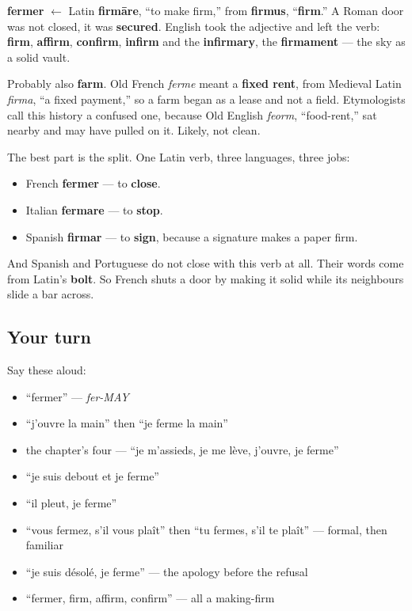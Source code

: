 \begin{cousinweb}
\textbf{fermer} $\leftarrow$ Latin \textbf{firmāre}, \textquotedblleft{}to make firm,\textquotedblright{} from \textbf{firmus}, \textquotedblleft{}\textbf{firm}.\textquotedblright{} A Roman door was not closed, it was \textbf{secured}. English took the adjective and left the verb: \textbf{firm}, \textbf{affirm}, \textbf{confirm}, \textbf{infirm} and the \textbf{infirmary}, the \textbf{firmament} — the sky as a solid vault.

Probably also \textbf{farm}. Old French \emph{ferme} meant a \textbf{fixed rent}, from Medieval Latin \emph{firma}, \textquotedblleft{}a fixed payment,\textquotedblright{} so a farm began as a lease and not a field. Etymologists call this history a confused one, because Old English \emph{feorm}, \textquotedblleft{}food-rent,\textquotedblright{} sat nearby and may have pulled on it. Likely, not clean.

The best part is the split. One Latin verb, three languages, three jobs:

\begin{itemize}
\raggedright
  \item French \textbf{fermer} — to \textbf{close}.
  \item Italian \textbf{fermare} — to \textbf{stop}.
  \item Spanish \textbf{firmar} — to \textbf{sign}, because a signature makes a paper firm.
\end{itemize}

And Spanish and Portuguese do not close with this verb at all. Their words come from Latin's \textbf{bolt}. So French shuts a door by making it solid while its neighbours slide a bar across.
\end{cousinweb}

\subsection*{Your turn}
Say these aloud:

\begin{itemize}
\raggedright
  \item \textquotedblleft{}fermer\textquotedblright{} — \emph{fer-MAY}
  \item \textquotedblleft{}j'ouvre la main\textquotedblright{} then \textquotedblleft{}je ferme la main\textquotedblright{}
  \item the chapter's four — \textquotedblleft{}je m'assieds, je me lève, j'ouvre, je ferme\textquotedblright{}
  \item \textquotedblleft{}je suis debout et je ferme\textquotedblright{}
  \item \textquotedblleft{}il pleut, je ferme\textquotedblright{}
  \item \textquotedblleft{}vous fermez, s'il vous plaît\textquotedblright{} then \textquotedblleft{}tu fermes, s'il te plaît\textquotedblright{} — formal, then familiar
  \item \textquotedblleft{}je suis désolé, je ferme\textquotedblright{} — the apology before the refusal
  \item \textquotedblleft{}fermer, firm, affirm, confirm\textquotedblright{} — all a making-firm
\end{itemize}

